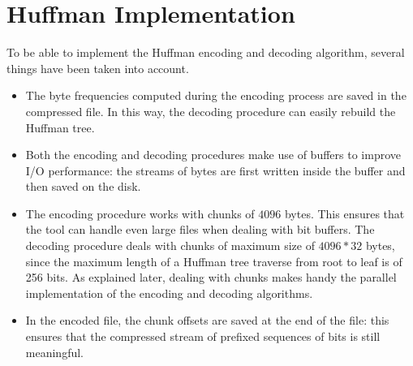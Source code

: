 \section{Huffman Implementation}
To be able to implement the Huffman encoding and decoding algorithm, several things have been taken into account.
\begin{itemize}
    \item The byte frequencies computed during the encoding process are saved in the compressed file. In this way, the decoding procedure can easily rebuild the Huffman tree.
    \item Both the encoding and decoding procedures make use of buffers to improve I/O performance: the streams of bytes are first written inside the buffer and then saved on the disk.
    \item The encoding procedure works with chunks of \(4096\) bytes. This ensures that the tool can handle even large files when dealing with bit buffers. The decoding procedure deals with chunks of maximum size of \(4096*32\) bytes, since the maximum length of a Huffman tree traverse from root to leaf is of 256 bits. As explained later, dealing with chunks makes handy the parallel implementation of the encoding and decoding algorithms.
    \item In the encoded file, the chunk offsets are saved at the end of the file: this ensures that the compressed stream of prefixed sequences of bits is still meaningful.
\end{itemize}
